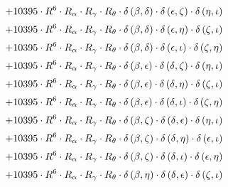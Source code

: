 \begin{subequations}
\begin{gather}
 \\[0.2em] \notag 		 + 10395 \cdot R^{6} \cdot R_{\alpha{}} \cdot R_{\gamma{}} \cdot R_{\theta{}} \cdot \delta{}\left(\beta{}, \delta{}\right) \cdot \delta{}\left(\epsilon{}, \zeta{}\right) \cdot \delta{}\left(\eta{}, \iota{}\right) 
 \\[0.2em] \notag 		 + 10395 \cdot R^{6} \cdot R_{\alpha{}} \cdot R_{\gamma{}} \cdot R_{\theta{}} \cdot \delta{}\left(\beta{}, \delta{}\right) \cdot \delta{}\left(\epsilon{}, \eta{}\right) \cdot \delta{}\left(\zeta{}, \iota{}\right) 
 \\[0.2em] \notag 		 + 10395 \cdot R^{6} \cdot R_{\alpha{}} \cdot R_{\gamma{}} \cdot R_{\theta{}} \cdot \delta{}\left(\beta{}, \delta{}\right) \cdot \delta{}\left(\epsilon{}, \iota{}\right) \cdot \delta{}\left(\zeta{}, \eta{}\right) 
 \\[0.2em] \notag 		 + 10395 \cdot R^{6} \cdot R_{\alpha{}} \cdot R_{\gamma{}} \cdot R_{\theta{}} \cdot \delta{}\left(\beta{}, \epsilon{}\right) \cdot \delta{}\left(\delta{}, \zeta{}\right) \cdot \delta{}\left(\eta{}, \iota{}\right) 
 \\[0.2em] \notag 		 + 10395 \cdot R^{6} \cdot R_{\alpha{}} \cdot R_{\gamma{}} \cdot R_{\theta{}} \cdot \delta{}\left(\beta{}, \epsilon{}\right) \cdot \delta{}\left(\delta{}, \eta{}\right) \cdot \delta{}\left(\zeta{}, \iota{}\right) 
 \\[0.2em] \notag 		 + 10395 \cdot R^{6} \cdot R_{\alpha{}} \cdot R_{\gamma{}} \cdot R_{\theta{}} \cdot \delta{}\left(\beta{}, \epsilon{}\right) \cdot \delta{}\left(\delta{}, \iota{}\right) \cdot \delta{}\left(\zeta{}, \eta{}\right) 
 \\[0.2em] \notag 		 + 10395 \cdot R^{6} \cdot R_{\alpha{}} \cdot R_{\gamma{}} \cdot R_{\theta{}} \cdot \delta{}\left(\beta{}, \zeta{}\right) \cdot \delta{}\left(\delta{}, \epsilon{}\right) \cdot \delta{}\left(\eta{}, \iota{}\right) 
 \\[0.2em] \notag 		 + 10395 \cdot R^{6} \cdot R_{\alpha{}} \cdot R_{\gamma{}} \cdot R_{\theta{}} \cdot \delta{}\left(\beta{}, \zeta{}\right) \cdot \delta{}\left(\delta{}, \eta{}\right) \cdot \delta{}\left(\epsilon{}, \iota{}\right) 
 \\[0.2em] \notag 		 + 10395 \cdot R^{6} \cdot R_{\alpha{}} \cdot R_{\gamma{}} \cdot R_{\theta{}} \cdot \delta{}\left(\beta{}, \zeta{}\right) \cdot \delta{}\left(\delta{}, \iota{}\right) \cdot \delta{}\left(\epsilon{}, \eta{}\right) 
 \\[0.2em] \notag 		 + 10395 \cdot R^{6} \cdot R_{\alpha{}} \cdot R_{\gamma{}} \cdot R_{\theta{}} \cdot \delta{}\left(\beta{}, \eta{}\right) \cdot \delta{}\left(\delta{}, \epsilon{}\right) \cdot \delta{}\left(\zeta{}, \iota{}\right) 

\end{gather}
\end{subequations}
